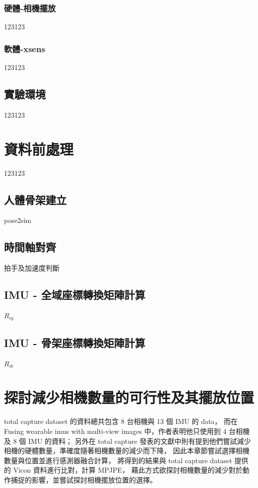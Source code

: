\subsubsection{硬體-相機擺放}
123123
\subsubsection{軟體-xsens}
123123

\subsection{實驗環境}
123123

\section{資料前處理}
123123

\subsection{人體骨架建立}
pose2sim

\subsection{時間軸對齊}
拍手及加速度判斷

\subsection{IMU - 全域座標轉換矩陣計算}
$R_{ig}$

\subsection{IMU - 骨架座標轉換矩陣計算}
$R_{ib}$

\section{探討減少相機數量的可行性及其擺放位置}
total capture dataset 的資料總共包含 8 台相機與 13 個 IMU 的 data，
而在 Fusing wearable imus with multi-view images 中，作者表明他只使用到 4 台相機及 8 個 IMU 的資料；
另外在 total capture 發表的文獻中則有提到他們嘗試減少相機的硬體數量，準確度隨著相機數量的減少而下降，
因此本章節嘗試選擇相機數量與位置並進行感測器融合計算，
將得到的結果與 total capture dataset 提供的 Vicon 資料進行比對，計算 MPJPE，
藉此方式欲探討相機數量的減少對於動作捕捉的影響，並嘗試探討相機擺放位置的選擇。

